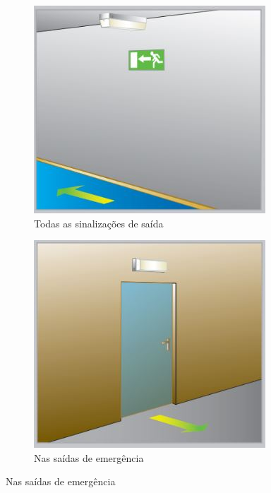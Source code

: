 \begin{figure}[H]
\begin{subfigure}[b]{0.30\textwidth}
			\includegraphics[width=\textwidth]{Figures/3. Lighting/light-safety2.jpg}
			\caption{Todas as sinalizações de saída}
			\label{fig: style 1 emergency b}
		\end{subfigure}
		\hfill
		\begin{subfigure}[b]{0.30\textwidth}
			\centering
			\includegraphics[width=\textwidth]{Figures/3. Lighting/light-safety3.jpg}
			\caption{Nas saídas de emergência}

\end{subfigure}
\end{figure}
